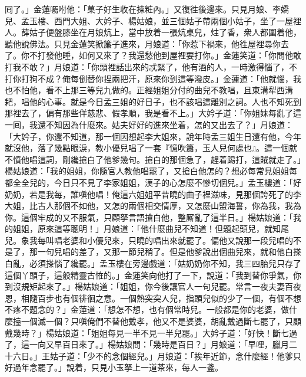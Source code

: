 囘了。」金蓮囑咐他：「菓子好生收在揀粧內。」又復徃後邊來。只見月娘、李嬌兒、孟玉樓、西門大姐、大妗子、楊姑娘，並三個姑子帶兩個小姑子，坐了一屋裡人。薛姑子便盤膝坐在月娘炕上，{}當中放着一張炕桌兒，炷了香，衆人都圍着他，聽他說佛法。只見金蓮笑掀簾子進來，{}月娘道：「你惹下禍來，他徃屋裡尋你去了。你不打發他睡，如何又來了？我還愁他到屋裡要打你。」金蓮笑道：「你問他敢打我不敢？」{}月娘道：「你頭裡話出來的忒緊了，他有酒的人，一時激得惱了，不打你打狗不成？俺每倒替你捏兩把汗，原來你到這等潑皮。」金蓮道：「他就惱，我也不怕他，看不上那三等兒九做的。正經姐姐分付的曲兒不教唱，且東溝犁西溝耙，唱他的心事。就是今日孟三姐的好日子，也不該唱這離別之詞。{}人也不知死到那裡去了，偏有那些佯慈悲、假孝順，我是看不上。」大妗子道：「你姐妹每亂了這一囘，我還不知因為什麼來。姑夫好好的進來坐着，怎的又出去了？」月娘道：「大妗子，你還不知道，那一個因想起李大姐來，說年時孟三姐生日還有他，今年就沒他，落了幾點眼淚，教小優兒唱了一套『憶吹簫，玉人兒何處也』。這一個就不憤他唱這詞，剛纔搶白了他爹幾句。搶白的那個急了，趕着踢打，這賊就走了。」楊姑娘道：「我的姐姐，你隨官人教他唱罷了，又搶白他怎的？想必每常見姐姐每都全全兒的，今日只不見了李家姐姐，漢子的心怎麼不慘切個兒。」孟玉樓道：「好奶奶，若是我每，誰嗔他唱！俺這六姐姐平昔曉的曲子裡滋味，見那個誇死了的李大姐，比古人那個不如他，又怎的兩個相交情厚，又怎麼山盟海誓，你為我，我為你。這個牢成的又不服氣，只顧拏言語搶白他，整厮亂了這半日。」楊姑娘道：「我的姐姐，原來這等聰明！」月娘道：「他什麼曲兒不知道！但題起頭兒，就知尾兒。象我每叫唱老婆和小優兒來，只曉的唱出來就罷了。偏他又說那一段兒唱的不是了，那一句兒唱的差了，又那一節兒稍了。但是他爹說出個曲兒來，就和他白搽白亂，必須搽惱了纔罷。」孟玉樓在旁邊戲道：「姑奶奶你不知，我三四胎兒只存了這個丫頭子，這般精靈古恠的。」金蓮笑向他打了一下，說道：「我到替你爭氣，你到沒規矩起來了。」楊姑娘道：「姐姐，你今後讓官人一句兒罷。常言一夜夫妻百夜恩，相隨百步也有個徘徊之意。一個熱突突人兒，指頭兒似的少了一個，{}有個不想不疼不題念的？」金蓮道：「想怎不想，也有個常時兒。一般都是你的老婆，做什麼擡一個滅一個？只嗔俺們不替他戴孝，他又不是婆婆，胡亂戴過斷七罷了，{}只顧戴幾時？」楊姑娘道：「姐姐每見一半不見一半兒罷。」大妗子道：「好快！斷七過了，這一向又早百日來了。」{}楊姑娘問：「幾時是百日？」月娘道：「早哩，臘月二十六日。」王姑子道：「少不的念個經兒。」{}月娘道：「挨年近節，念什麼經！他爹只好過年念罷了。」說着，只見小玉拏上一道茶來，每人一盞。


